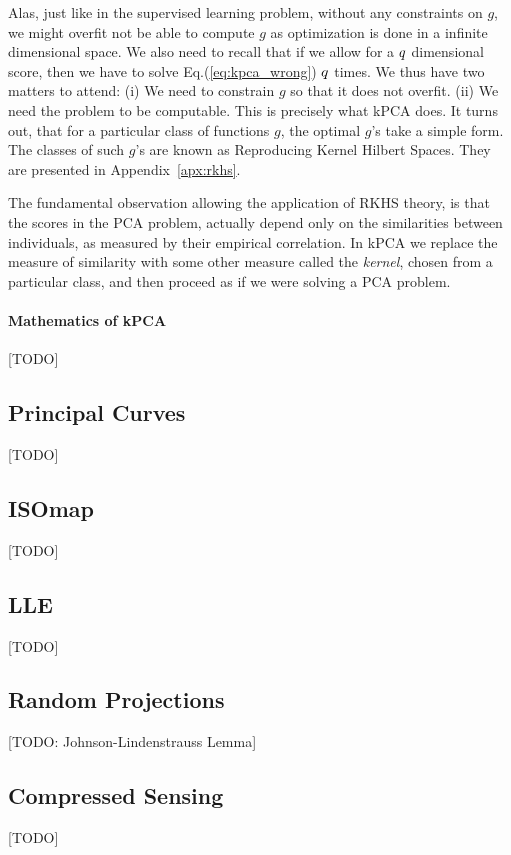 Alas, just like in the supervised learning problem, without any constraints on $g$, we might overfit \andor not be able to compute $g$ as optimization is done in a infinite dimensional space. 
We also need to recall that if we allow for a $q$ dimensional score, then we have to solve Eq.(\ref{eq:kpca_wrong}) $q$ times.
We thus have two matters to attend:
(i) We need to constrain $g$ so that it does not overfit.
(ii) We need the problem to be computable.
This is precisely what kPCA does. 
It turns out, that for a particular class of functions $g$, the optimal $g$'s take a simple form. 
The classes of such $g$'s are known as Reproducing Kernel Hilbert Spaces. They are presented in Appendix~\ref{apx:rkhs}.

The fundamental observation allowing the application of RKHS theory, is that the scores in the PCA problem, actually depend only on the similarities between individuals, as measured by their empirical correlation. 
In kPCA we replace the measure of similarity with some other measure called the \emph{kernel}, chosen from a particular class, and then proceed as if we were solving a PCA problem.


\paragraph{Mathematics of kPCA}
[TODO]



\subsection{Principal Curves}
[TODO]


\subsection{ISOmap}
[TODO]


\subsection{LLE}
[TODO]



\subsection{Random Projections}
[TODO: Johnson-Lindenstrauss Lemma]



\subsection{Compressed Sensing}
\label{sec:compressed_sensing}
[TODO]



